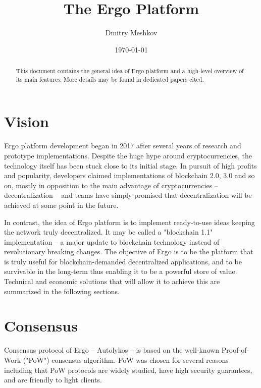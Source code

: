 \documentclass[]{article}
\begin{document}
    \title{The Ergo Platform}
    \author{Dmitry Meshkov}

    \date{\today}
    \maketitle

    \begin{abstract}
        This document contains the general idea of Ergo platform and a high-level overview of its main
        features. More details may be found in dedicated papers cited.
    \end{abstract}

    \section{Vision}

    Ergo platform development began in 2017 after several years of research and prototype
    implementations. Despite the huge hype around cryptocurrencies, the technology itself has
    been stuck close to its initial stage. In pursuit of high profits and popularity, developers claimed
    implementations of blockchain 2.0, 3.0 and so on, mostly in opposition to the main advantage of
    cryptocurrencies -- decentralization -- and teams have simply promised that decentralization will
    be achieved at some point in the future.

    In contrast, the idea of Ergo platform is to implement ready-to-use ideas keeping the network
    truly decentralized. It may be called a "blockchain 1.1" implementation -- a major update to
    blockchain technology instead of revolutionary breaking changes. The objective of Ergo is to be
    the platform that is truly useful for blockchain-demanded decentralized applications, and to be
    survivable in the long-term thus enabling it to be a powerful store of value. Technical and economic
    solutions that will allow it to achieve this are summarized in the following sections.

    \section{Consensus}

    Consensus protocol of Ergo -- Autolykos -- is based on the well-known Proof-of-Work ("PoW")
    consensus algorithm. PoW was chosen for several reasons including that PoW protocols are widely
    studied, have high security guarantees, and are friendly to light clients.
\end{document}
